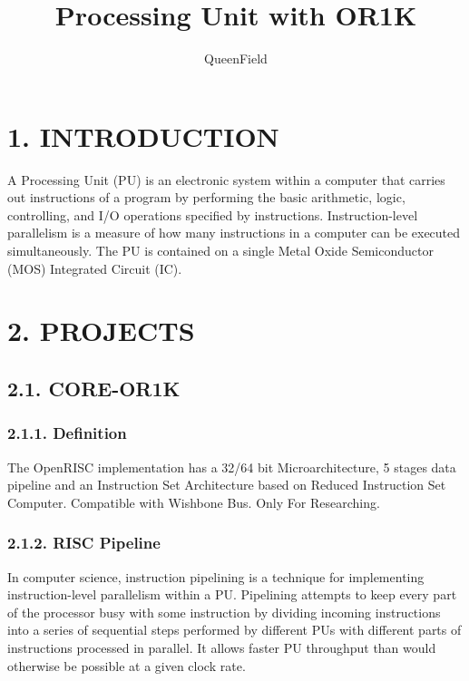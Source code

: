 \documentclass[]{article}
\title{Processing Unit with OR1K}
\author{QueenField}
\date{}
\begin{document}
\maketitle

\section{1. INTRODUCTION}\label{introduction}

A Processing Unit (PU) is an electronic system within a computer that
carries out instructions of a program by performing the basic
arithmetic, logic, controlling, and I/O operations specified by
instructions. Instruction-level parallelism is a measure of how many
instructions in a computer can be executed simultaneously. The PU is
contained on a single Metal Oxide Semiconductor (MOS) Integrated Circuit
(IC).

\section{2. PROJECTS}\label{projects}

\subsection{2.1. CORE-OR1K}\label{core-or1k}

\subsubsection{2.1.1. Definition}\label{definition}

The OpenRISC implementation has a 32/64 bit Microarchitecture, 5 stages
data pipeline and an Instruction Set Architecture based on Reduced
Instruction Set Computer. Compatible with Wishbone Bus. Only For
Researching.

\subsubsection{2.1.2. RISC Pipeline}\label{risc-pipeline}

In computer science, instruction pipelining is a technique for
implementing instruction-level parallelism within a PU. Pipelining
attempts to keep every part of the processor busy with some instruction
by dividing incoming instructions into a series of sequential steps
performed by different PUs with different parts of instructions
processed in parallel. It allows faster PU throughput than would
otherwise be possible at a given clock rate.
\end{document}
